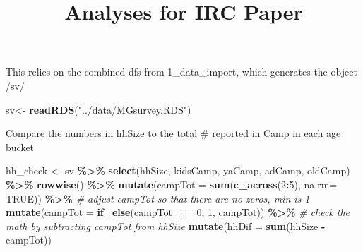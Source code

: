 \documentclass[
]{article}
\title{Analyses for IRC Paper}
\author{}
\date{\vspace{-2.5em}}
\newenvironment{Shaded}{\begin{snugshade}}{\end{snugshade}}
\newcommand{\AttributeTok}[1]{\textcolor[rgb]{0.13,0.29,0.53}{#1}}
\newcommand{\CommentTok}[1]{\textcolor[rgb]{0.56,0.35,0.01}{\textit{#1}}}
\newcommand{\ConstantTok}[1]{\textcolor[rgb]{0.56,0.35,0.01}{#1}}
\newcommand{\DecValTok}[1]{\textcolor[rgb]{0.00,0.00,0.81}{#1}}
\newcommand{\FunctionTok}[1]{\textcolor[rgb]{0.13,0.29,0.53}{\textbf{#1}}}
\newcommand{\NormalTok}[1]{#1}
\newcommand{\OtherTok}[1]{\textcolor[rgb]{0.56,0.35,0.01}{#1}}
\newcommand{\SpecialCharTok}[1]{\textcolor[rgb]{0.81,0.36,0.00}{\textbf{#1}}}
\newcommand{\StringTok}[1]{\textcolor[rgb]{0.31,0.60,0.02}{#1}}
\begin{document}
\maketitle

This relies on the combined dfs from 1\_data\_import, which generates
the object /sv/

\begin{Shaded}
\begin{Highlighting}[]
\NormalTok{sv}\OtherTok{\textless{}{-}} \FunctionTok{readRDS}\NormalTok{(}\StringTok{"../data/MGsurvey.RDS"}\NormalTok{)}
\end{Highlighting}
\end{Shaded}

Compare the numbers in hhSize to the total \# reported in Camp in each
age bucket

\begin{Shaded}
\begin{Highlighting}[]
\NormalTok{hh\_check }\OtherTok{\textless{}{-}}\NormalTok{ sv }\SpecialCharTok{\%\textgreater{}\%} 
  \FunctionTok{select}\NormalTok{(hhSize, kidsCamp, yaCamp, adCamp, oldCamp) }\SpecialCharTok{\%\textgreater{}\%}
  \FunctionTok{rowwise}\NormalTok{() }\SpecialCharTok{\%\textgreater{}\%}
  \FunctionTok{mutate}\NormalTok{(}\AttributeTok{campTot =} \FunctionTok{sum}\NormalTok{(}\FunctionTok{c\_across}\NormalTok{(}\DecValTok{2}\SpecialCharTok{:}\DecValTok{5}\NormalTok{), }\AttributeTok{na.rm=} \ConstantTok{TRUE}\NormalTok{)) }\SpecialCharTok{\%\textgreater{}\%}
\CommentTok{\# adjust campTot so that there are no zeros, min is 1}
    \FunctionTok{mutate}\NormalTok{(}\AttributeTok{campTot =} \FunctionTok{if\_else}\NormalTok{(campTot }\SpecialCharTok{==} \DecValTok{0}\NormalTok{, }\DecValTok{1}\NormalTok{, campTot)) }\SpecialCharTok{\%\textgreater{}\%}
  \CommentTok{\# check the math by subtracting campTot from hhSize}
    \FunctionTok{mutate}\NormalTok{(}\AttributeTok{hhDif =} \FunctionTok{sum}\NormalTok{(hhSize }\SpecialCharTok{{-}}\NormalTok{ campTot))}
\end{Highlighting}
\end{Shaded}
\end{document}
